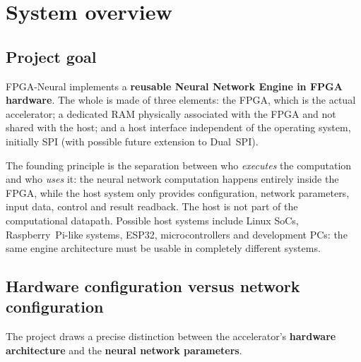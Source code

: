 \chapter{System overview}
\label{ch:overview}

\section{Project goal}
FPGA-Neural implements a \textbf{reusable Neural Network Engine in FPGA hardware}.
The whole is made of three elements: the FPGA, which is the actual accelerator; a
dedicated RAM physically associated with the FPGA and not shared with the host; and a
host interface independent of the operating system, initially SPI (with possible
future extension to Dual~SPI).

The founding principle is the separation between who \emph{executes} the computation
and who \emph{uses} it: the neural network computation happens entirely inside the
FPGA, while the host system only provides configuration, network parameters, input
data, control and result readback. The host is not part of the computational datapath.
Possible host systems include Linux SoCs, Raspberry~Pi-like systems, ESP32,
microcontrollers and development PCs: the same engine architecture must be usable in
completely different systems.

\begin{center}
\end{center}

\section{Hardware configuration versus network configuration}
The project draws a precise distinction between the accelerator's \textbf{hardware
architecture} and the \textbf{neural network parameters}.

